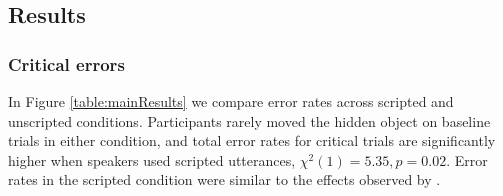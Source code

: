 \documentclass[manuscript]{stjour}
\begin{document}

\subsection{Results}

\subsubsection{Critical errors}

In Figure \ref{table:mainResults} we compare error rates across scripted and unscripted conditions. Participants rarely moved the hidden object on baseline trials in either condition, and total error rates for critical trials are significantly higher when speakers used scripted utterances, $\chi^2(1) = 5.35, p = 0.02$. Error rates in the scripted condition were similar to the effects observed by \cite{KeysarLinBarr03_LimitsOnTheoryOfMindUse}. %
\end{document}
